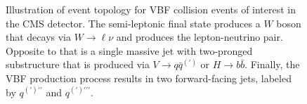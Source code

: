 \begin{figure}[htbp]
  \centering
  
  \caption{
    Illustration of event topology for VBF collision events of interest in the CMS detector.
    The semi-leptonic final state produces a $W$ boson that decays via $W\to\ell\nu$ and produces the lepton-neutrino pair.
    Opposite to that is a single massive jet with two-pronged substructure that is produced via $V\to q\bar{q}^{(\prime)}$ or $H\to b\bar{b}$.
    Finally, the VBF production process results in two forward-facing jets, labeled by $q^{(\prime)\prime\prime}$ and $q^{(\prime)\prime\prime\prime}$.
  }
  \label{fig:eventTop}
\end{figure}
